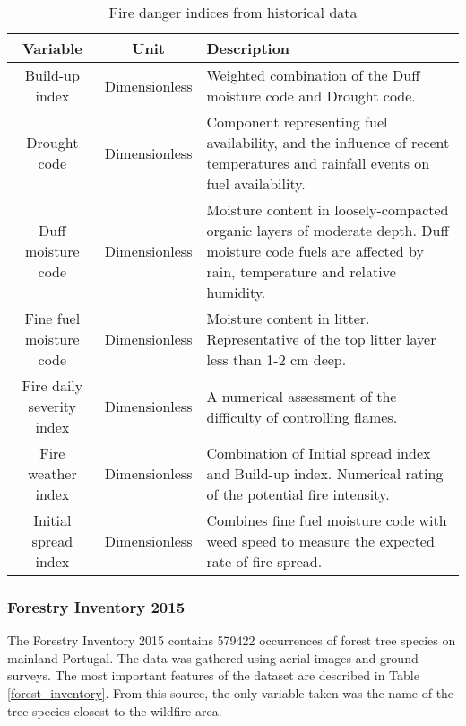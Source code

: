 \begin{table}[H]
	\caption{Fire danger indices from historical data \cite{CopernicusCDS2019}}
	\label{copernicus_danger_indices}
	\centering
	\small
	\begin{tabular}{ccp{7.5cm}} %
		\hline
		\textbf{Variable} & \textbf{Unit} & \textbf{Description}\\
		\hline
		Build-up index & Dimensionless & Weighted combination of the Duff moisture code and Drought code. \\
		\hline
		Drought code & Dimensionless & Component representing fuel availability, and the influence of recent temperatures and rainfall events on fuel availability. \\
		\hline
		Duff moisture code & Dimensionless & Moisture content in loosely-compacted organic layers of moderate depth. Duff moisture code fuels are affected by rain, temperature and relative humidity. \\
		\hline
		Fine fuel moisture code & Dimensionless &  Moisture content in litter. Representative of the top litter layer less than 1-2 cm deep. \\
		\hline
		Fire daily severity index & Dimensionless &  A numerical assessment of the difficulty of controlling flames. \\
		\hline
		Fire weather index & Dimensionless &  Combination of Initial spread index and Build-up index. Numerical rating of the potential fire intensity. \\
		\hline
		Initial spread index & Dimensionless & Combines fine fuel moisture code with weed speed to measure the expected rate of fire spread.
	\end{tabular}
\end{table}

\subsubsection{Forestry Inventory 2015 \cite{uva2021forestry,https://doi.org/10.15468/dl.zwfmbt}}

The Forestry Inventory 2015 contains 579422 occurrences of forest tree species on mainland Portugal. The data was gathered using aerial images and ground surveys. The most important features of the dataset are described in Table \ref{forest_inventory}. From this source, the only variable taken was the name of the tree species closest to the wildfire area.

